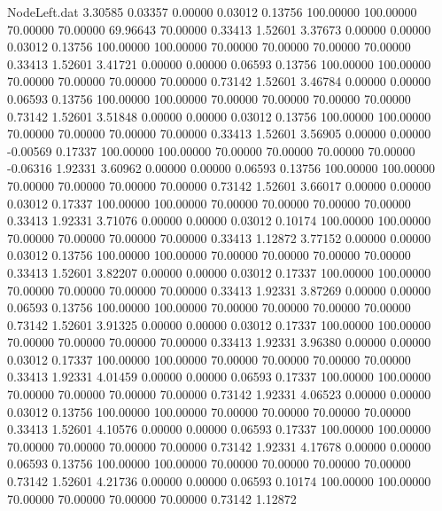 \begin{filecontents}{NodeLeft.dat}
   3.30585    0.03357    0.00000     0.03012    0.13756  100.00000  100.00000   70.00000   70.00000   69.96643   70.00000    0.33413    1.52601
   3.37673    0.00000    0.00000     0.03012    0.13756  100.00000  100.00000   70.00000   70.00000   70.00000   70.00000    0.33413    1.52601
   3.41721    0.00000    0.00000     0.06593    0.13756  100.00000  100.00000   70.00000   70.00000   70.00000   70.00000    0.73142    1.52601
   3.46784    0.00000    0.00000     0.06593    0.13756  100.00000  100.00000   70.00000   70.00000   70.00000   70.00000    0.73142    1.52601
   3.51848    0.00000    0.00000     0.03012    0.13756  100.00000  100.00000   70.00000   70.00000   70.00000   70.00000    0.33413    1.52601
   3.56905    0.00000    0.00000    -0.00569    0.17337  100.00000  100.00000   70.00000   70.00000   70.00000   70.00000   -0.06316    1.92331
   3.60962    0.00000    0.00000     0.06593    0.13756  100.00000  100.00000   70.00000   70.00000   70.00000   70.00000    0.73142    1.52601
   3.66017    0.00000    0.00000     0.03012    0.17337  100.00000  100.00000   70.00000   70.00000   70.00000   70.00000    0.33413    1.92331
   3.71076    0.00000    0.00000     0.03012    0.10174  100.00000  100.00000   70.00000   70.00000   70.00000   70.00000    0.33413    1.12872
   3.77152    0.00000    0.00000     0.03012    0.13756  100.00000  100.00000   70.00000   70.00000   70.00000   70.00000    0.33413    1.52601
   3.82207    0.00000    0.00000     0.03012    0.17337  100.00000  100.00000   70.00000   70.00000   70.00000   70.00000    0.33413    1.92331
   3.87269    0.00000    0.00000     0.06593    0.13756  100.00000  100.00000   70.00000   70.00000   70.00000   70.00000    0.73142    1.52601
   3.91325    0.00000    0.00000     0.03012    0.17337  100.00000  100.00000   70.00000   70.00000   70.00000   70.00000    0.33413    1.92331
   3.96380    0.00000    0.00000     0.03012    0.17337  100.00000  100.00000   70.00000   70.00000   70.00000   70.00000    0.33413    1.92331
   4.01459    0.00000    0.00000     0.06593    0.17337  100.00000  100.00000   70.00000   70.00000   70.00000   70.00000    0.73142    1.92331
   4.06523    0.00000    0.00000     0.03012    0.13756  100.00000  100.00000   70.00000   70.00000   70.00000   70.00000    0.33413    1.52601
   4.10576    0.00000    0.00000     0.06593    0.17337  100.00000  100.00000   70.00000   70.00000   70.00000   70.00000    0.73142    1.92331
   4.17678    0.00000    0.00000     0.06593    0.13756  100.00000  100.00000   70.00000   70.00000   70.00000   70.00000    0.73142    1.52601
   4.21736    0.00000    0.00000     0.06593    0.10174  100.00000  100.00000   70.00000   70.00000   70.00000   70.00000    0.73142    1.12872

\end{filecontents}
